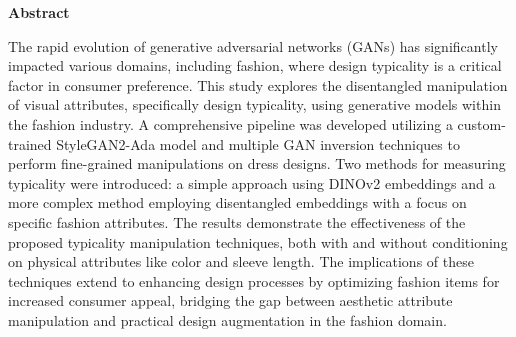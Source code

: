 \clearpage

\begin{center}
    \textbf{Abstract}
\end{center}
The rapid evolution of generative adversarial networks (GANs) has significantly impacted various domains, including fashion, where design typicality is a critical factor in consumer preference. This study explores the disentangled manipulation of visual attributes, specifically design typicality, using generative models within the fashion industry. A comprehensive pipeline was developed utilizing a custom-trained StyleGAN2-Ada model and multiple GAN inversion techniques to perform fine-grained manipulations on dress designs. Two methods for measuring typicality were introduced: a simple approach using DINOv2 embeddings and a more complex method employing disentangled embeddings with a focus on specific fashion attributes. The results demonstrate the effectiveness of the proposed typicality manipulation techniques, both with and without conditioning on physical attributes like color and sleeve length. The implications of these techniques extend to enhancing design processes by optimizing fashion items for increased consumer appeal, bridging the gap between aesthetic attribute manipulation and practical design augmentation in the fashion domain.

\newpage